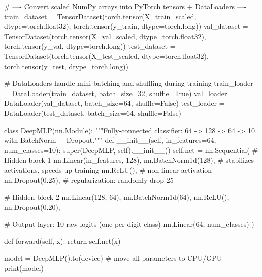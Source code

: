 \begin{codebox}[title={Convert scaled NumPy arrays into PyTorch tensors + DataLoaders}]
# ---- Convert scaled NumPy arrays into PyTorch tensors + DataLoaders ----
train_dataset = TensorDataset(torch.tensor(X_train_scaled, dtype=torch.float32), torch.tensor(y_train, dtype=torch.long))
val_dataset   = TensorDataset(torch.tensor(X_val_scaled, dtype=torch.float32),   torch.tensor(y_val, dtype=torch.long))
test_dataset  = TensorDataset(torch.tensor(X_test_scaled, dtype=torch.float32),  torch.tensor(y_test, dtype=torch.long))

# DataLoaders handle mini-batching and shuffling during training
train_loader = DataLoader(train_dataset, batch_size=32, shuffle=True)
val_loader   = DataLoader(val_dataset, batch_size=64, shuffle=False)
test_loader  = DataLoader(test_dataset, batch_size=64, shuffle=False)

class DeepMLP(nn.Module):
    """Fully-connected classifier: 64 -> 128 -> 64 -> 10 with BatchNorm + Dropout."""
    def __init__(self, in_features=64, num_classes=10):
        super(DeepMLP, self).__init__()
        self.net = nn.Sequential(
            # Hidden block 1
            nn.Linear(in_features, 128),
            nn.BatchNorm1d(128),    # stabilizes activations, speeds up training
            nn.ReLU(),              # non-linear activation
            nn.Dropout(0.25),       # regularization: randomly drop 25%

            # Hidden block 2
            nn.Linear(128, 64),
            nn.BatchNorm1d(64),
            nn.ReLU(),
            nn.Dropout(0.20),

            # Output layer: 10 raw logits (one per digit class)
            nn.Linear(64, num_classes)
        )

    def forward(self, x):
        return self.net(x)

model = DeepMLP().to(device)   # move all parameters to CPU/GPU
print(model)
\end{codebox}

